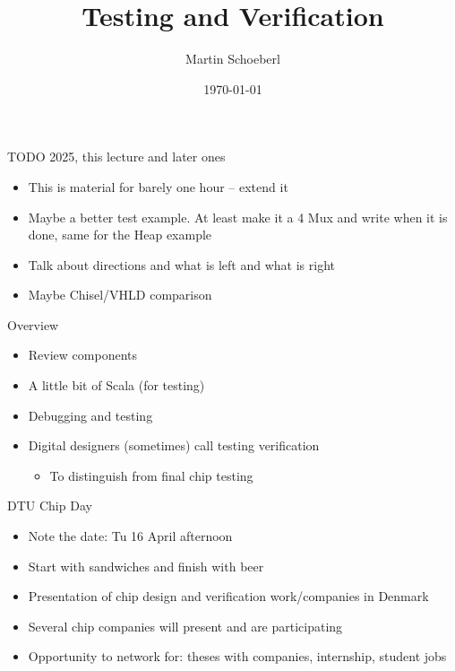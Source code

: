 

\newif\ifbook


\title{Testing and Verification}
\author{Martin Schoeberl}
\date{\today}



\begin{frame}
\titlepage
\end{frame}

\begin{frame}[fragile]{TODO 2025, this lecture and later ones}
\begin{itemize}
\item This is material for barely one hour -- extend it
\item Maybe a better test example. At least make it a 4 Mux and write when it is done, same for the Heap example
\item Talk about directions and what is left and what is right
\item Maybe Chisel/VHLD comparison
\end{itemize}
\end{frame}

\begin{frame}[fragile]{Overview}
\begin{itemize}
\item Review components
\item A little bit of Scala (for testing)
\item Debugging and testing
\item Digital designers (sometimes) call testing verification
\begin{itemize}
\item To distinguish from final chip testing
\end{itemize}
\end{itemize}
\end{frame}

\begin{frame}[fragile]{DTU Chip Day}
\begin{itemize}
\item Note the date: Tu 16 April afternoon
\item Start with sandwiches and finish with beer
\item Presentation of chip design and verification work/companies in Denmark
\item Several chip companies will present and are participating
\item Opportunity to network for: theses with companies, internship, student jobs
\end{itemize}
\end{frame}

